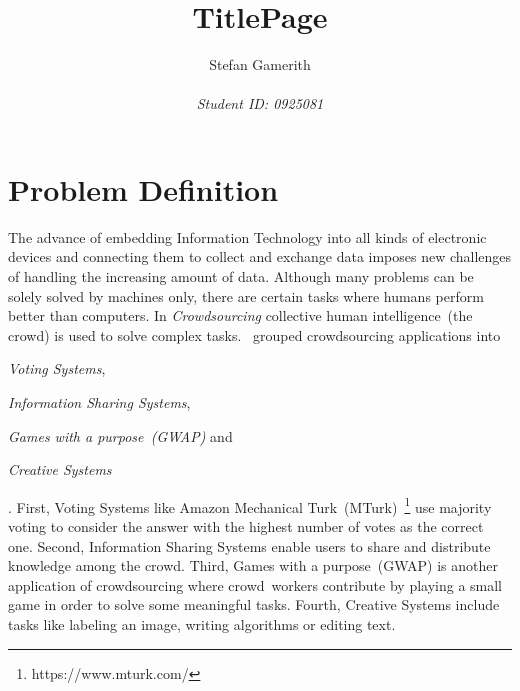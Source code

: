 \documentclass[12pt, notitlepage]{article}
\title{TitlePage}
\author{Stefan Gamerith\\\\
		\emph{Student ID: 0925081}}
\begin{document}
	\maketitle
	\thispagestyle{empty}
	\newpage
\setcounter{page}{1}

\section{Problem Definition}

The advance of embedding Information Technology into all kinds of electronic devices and connecting them to collect and exchange data imposes new challenges of handling the increasing amount of data. Although many problems can be solely solved by machines only, there are certain tasks where humans perform better than computers. In \emph{Crowdsourcing} collective human intelligence~(the crowd) is used to solve complex tasks. \citet{yuen2011survey}~grouped crowdsourcing applications into 
\begin{inparaenum}[1)]
		\item \emph{Voting Systems},
		\item \emph{Information Sharing Systems},
		\item \emph{Games with a purpose~(GWAP)} and
		\item \emph{Creative Systems}
\end{inparaenum}. 
First, Voting Systems like Amazon Mechanical Turk~(MTurk)~\footnote{https://www.mturk.com/} use majority voting to consider the answer with the highest number of votes as the correct one. Second, Information Sharing Systems enable users to share and distribute knowledge among the crowd. Third, Games with a purpose~(GWAP) is another application of crowdsourcing where crowd~workers contribute by playing a small game in order to solve some meaningful tasks. Fourth, Creative Systems include tasks like labeling an image, writing algorithms or editing text. 
\end{document}
